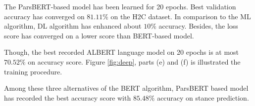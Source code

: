 The \ac{ParsBERT}-based model has been learned for 20 epochs. Best validation accuracy has converged on $81.11\%$ on the \ac{H2C} dataset. In comparison to the \ac{ML} algorithm, \ac{DL} algorithm has enhanced about $10\%$ accuracy. Besides, the loss score has converged on a lower score than \ac{BERT}-based model.

Though, the best recorded \ac{ALBERT} language model on 20 epochs is at most $70.52\%$ on accuracy score. Figure \ref{fig:deep}, parts (e) and (f) is illustrated the training procedure.

Among these three alternatives of the \ac{BERT} algorithm, \ac{ParsBERT} based model has recorded the best accuracy score with $85.48\%$ accuracy on stance prediction.  
\begin{figure}%
	\centering
	\qquad
	\qquad
	\qquad

\end{figure}
